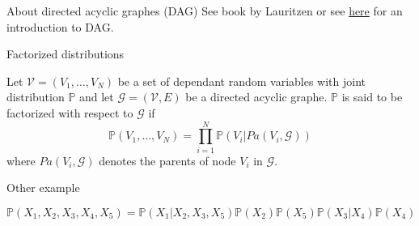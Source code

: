 \documentclass[compress,10pt]{beamer}
\begin{document}
\begin{frame}{About directed acyclic graphes (DAG)}
See book by Lauritzen or see \href{https://www.stat.cmu.edu/~larry/=sml/DAGs.pdf}{here}  for an introduction to DAG.

\begin{block}{Factorized distributions}

Let $\mathcal{V} = (V_1, \dots, V_N)$ be  a set of dependant random variables with joint distribution $\mathbb{P}$ and let $\mathcal{G} = (\mathcal{V},E)$ be a directed  acyclic graphe. $\mathbb{P}$  is said to be factorized with respect to $\mathcal{G}$ if 
$$\mathbb{P}(V_1, \dots, V_N) = \prod_{i=1}^N \mathbb{P}(V_i | Pa(V_i,\mathcal{G}))$$
where  $Pa(V_i,\mathcal{G})$ denotes the parents of node $V_i$ in $\mathcal{G}$. 
\end{block}
\end{frame}



\begin{frame}{Other example}
\begin{center}
  \end{center}
 
 
$$\mathbb{P}(X_1,X_2,X_3,X_4,X_5) = \mathbb{P}(X_1 |X_2,X_3,X_5)\mathbb{P}(X_2)\mathbb{P}(X_5)\mathbb{P}(X_3|X_4)\mathbb{P}(X_4)$$
\end{frame}
\end{document}
